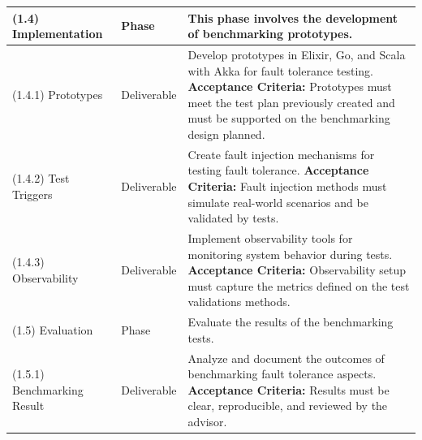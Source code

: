 \begin{longtable}{|p{3cm}|p{2.5cm}|p{8cm}|}
      (1.4) Implementation           & Phase                 & This phase involves the development of benchmarking prototypes.                                                                                                                                                                                                                                                                                           \\ \hline
      (1.4.1) Prototypes             & Deliverable           & Develop prototypes in Elixir, Go, and Scala with Akka for fault tolerance testing. \newline \textbf{Acceptance Criteria:} Prototypes must meet the test plan previously created and must be supported on the benchmarking design planned.                                                                                                                 \\ \hline
      (1.4.2) Test Triggers          & Deliverable           & Create fault injection mechanisms for testing fault tolerance. \newline \textbf{Acceptance Criteria:} Fault injection methods must simulate real-world scenarios and be validated by tests.                                                                                                                                                               \\ \hline
      (1.4.3) Observability          & Deliverable           & Implement observability tools for monitoring system behavior during tests. \newline \textbf{Acceptance Criteria:} Observability setup must capture the metrics defined on the test validations methods.                                                                                                                                                   \\ \hline
      \hline %

      (1.5) Evaluation               & Phase                 & Evaluate the results of the benchmarking tests.                                                                                                                                                                                                                                                                                                           \\ \hline
      (1.5.1) Benchmarking Result    & Deliverable           & Analyze and document the outcomes of benchmarking fault tolerance aspects. \newline \textbf{Acceptance Criteria:} Results must be clear, reproducible, and reviewed by the advisor.                                                                                                                                                                       \\ \hline
      \hline %


\end{longtable}
